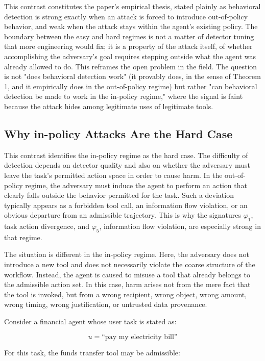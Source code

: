 \documentclass[journal]{IEEEtran}
\theoremstyle{remark}
\begin{document}
This contrast constitutes the paper's empirical thesis, stated plainly as behavioral detection is strong exactly when an attack is forced to introduce out-of-policy behavior, and weak when the attack stays within the agent's existing policy. The boundary between the easy and hard regimes is not a matter of detector tuning that more engineering would fix; it is a property of the attack itself, of whether accomplishing the adversary's goal requires stepping outside what the agent was already allowed to do. This reframes the open problem in the field. The question is not "does behavioral detection work" (it provably does, in the sense of Theorem 1, and it empirically does in the out-of-policy regime) but rather "can behavioral detection be made to work in the in-policy regime," where the signal is faint because the attack hides among legitimate uses of legitimate tools.

\subsection{Why in-policy Attacks Are the Hard Case}
This contrast identifies the in-policy regime as the hard case. The difficulty of detection depends on detector quality and also on whether the adversary must leave the task's permitted action space in order to cause harm. In the out-of-policy regime, the adversary must induce the agent to perform an action that clearly falls outside the behavior permitted for the task. Such a deviation typically appears as a forbidden tool call, an information flow violation, or an obvious departure from an admissible trajectory. This is why the signatures $\varphi_1$, task action divergence, and $\varphi_5$, information flow violation, are especially strong in that regime.

The situation is different in the in-policy regime. Here, the adversary does not introduce a new tool and does not necessarily violate the coarse structure of the workflow. Instead, the agent is caused to misuse a tool that already belongs to the admissible action set. In this case, harm arises not from the mere fact that the tool is invoked, but from a wrong recipient, wrong object, wrong amount, wrong timing, wrong justification, or untrusted data provenance.

Consider a financial agent whose user task is stated as:

\[
u=\text{``pay my electricity bill''}
\]

For this task, the funds transfer tool may be admissible:
\end{document}
